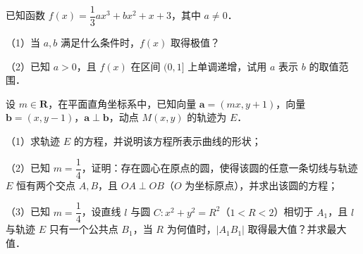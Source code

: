\begin{question}
已知函数 $f(x)=\dfrac13ax^3+bx^2+x+3$，其中 $a\neq0$．

（1）当 $a,b$ 满足什么条件时，$f(x)$ 取得极值？

（2）已知 $a>0$，且 $f(x)$ 在区间 $(0,1]$ 上单调递增，试用 $a$ 表示 $b$ 的取值范围．

\end{question}
\begin{question}
设 $m\in\mathbf R$，在平面直角坐标系中，已知向量 $\boldsymbol a=(mx,y+1)$，向量 $\boldsymbol b=(x,y-1)$，$\boldsymbol a\perp\boldsymbol b$，动点 $M(x,y)$ 的轨迹为 $E$．

（1）求轨迹 $E$ 的方程，并说明该方程所表示曲线的形状；

（2）已知 $m=\dfrac14$，证明：存在圆心在原点的圆，使得该圆的任意一条切线与轨迹 $E$ 恒有两个交点 $A,B$，且 $OA\perp OB$（$O$ 为坐标原点），并求出该圆的方程；

（3）已知 $m=\dfrac14$，设直线 $l$ 与圆 $C:x^2+y^2=R^2$（$1<R<2$）相切于 $A_1$，且 $l$ 与轨迹 $E$ 只有一个公共点 $B_1$，当 $R$ 为何值时，$|A_1B_1|$ 取得最大值？并求最大值．

\end{question}